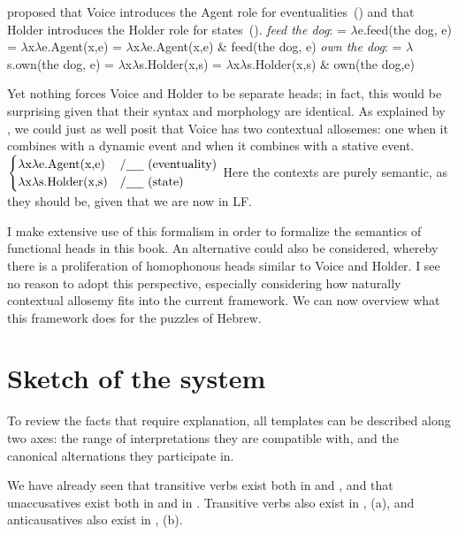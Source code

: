 \cite{kratzer96} proposed that Voice introduces the Agent role for eventualities~(\nextx) and that Holder introduces the Holder role for states~(\anextx).
\pex \emph{feed the dog}:
	\a {} = $\lambda$e.feed(the dog, e)
	\a {} = $\lambda$x$\lambda$e.Agent(x,e)
	\a {} = $\lambda$x$\lambda$e.Agent(x,e) \& feed(the dog, e)
\xe
\pex \emph{own the dog}:
	\a {} = $\lambda$s.own(the dog, e)
	\a {} = $\lambda$x$\lambda$s.Holder(x,s)
	\a {} = $\lambda$x$\lambda$s.Holder(x,s) \& own(the dog,e)
\xe

Yet nothing forces Voice and Holder to be separate heads; in fact, this would be surprising given that their syntax and morphology are identical. As explained by \cite{wood15springer}, we could just as well posit that Voice has two contextual allosemes: one when it combines with a dynamic event and when it combines with a stative event.
\ex {} \lra~ $\begin{cases}
	\lambda\text{x}\lambda\text{e.Agent(x,e)} & / \trace~ \text{(eventuality)} \\
	\lambda\text{x}\lambda\text{s.Holder(x,s)} & / \trace~ \text{(state)} \\
	\end{cases}$ 
\xe
Here the contexts are purely semantic, as they should be, given that we are now in LF.

I make extensive use of this formalism in order to formalize the semantics of functional heads in this book. An alternative could also be considered, whereby there is a proliferation of homophonous heads similar to Voice and Holder. I see no reason to adopt this perspective, especially considering how naturally contextual allosemy fits into the current framework. We can now overview what this framework does for the puzzles of Hebrew.


\section{Sketch of the system} \label{intro:sketch}
To review the facts that require explanation, all templates can be described along two axes: the range of interpretations they are compatible with, and the canonical alternations they participate in.

We have already seen that transitive verbs exist both in {\tkal} and {\thif}, and that unaccusatives exist both in {\tkal} and in {\tnif}. Transitive verbs also exist in {\tpie}, (\nextx a), and anticausatives also exist in {\thit}, (\nextx b).
\ex\label{ex:counter1}
\xe

